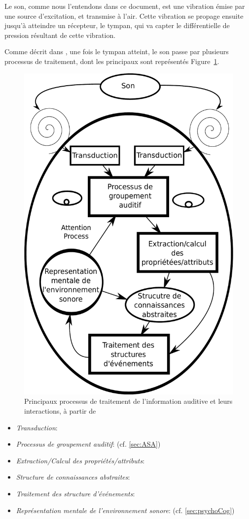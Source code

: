 Le son, comme nous l'entendons dans ce document, est une vibration émise par une source d'excitation, et transmise à l'air. Cette vibration se propage ensuite jusqu'à atteindre un récepteur, le tympan, qui va capter le différentielle de pression résultant de cette vibration. 

Comme décrit dans \cite{mcadams1994penser}, une fois le tympan atteint, le son passe par plusieurs processus de traitement, dont les principaux sont représentés Figure~\ref{fig:traitementSonMcAdamsBigand}.

\begin{figure}[bth]
        \myfloatalign
        \includegraphics[width=.5\linewidth]{gfx/traitementSonMcAdamsBigand}
        \caption[Principaux processus de traitement de l'information auditive et leurs interactions]{Principaux processus de traitement de l'information auditive et leurs interactions, à partir de \cite{mcadams1994penser}}\label{fig:traitementSonMcAdamsBigand}
\end{figure}

\begin{itemize}
\item \textit{Transduction}: 
\item \textit{Processus de groupement auditif}: (cf. \ref{sec:ASA})
\item \textit{Extraction/Calcul des propriétés/attributs}: 
\item \textit{Structure de connaissances abstraites}: 
\item \textit{Traitement des structure d'événements}: 
\item \textit{Représentation mentale de l'environnement sonore}: (cf. \ref{sec:psychoCog})
\end{itemize}

